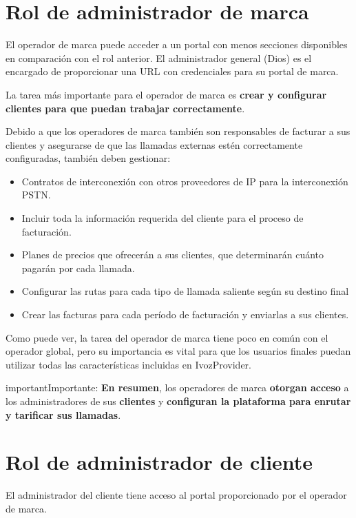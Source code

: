 \documentclass[letterpaper,10pt,spanish]{sphinxmanual}
\begin{document}
\section{Rol de administrador de marca}
\label{basic_concepts/operation_roles/index:brand-administrator-role}
El operador de marca puede acceder a un portal con menos secciones disponibles en comparación con el rol anterior. El administrador general (Dios) es el encargado de proporcionar una URL con credenciales para su portal de marca.

La tarea más importante para el operador de marca es \textbf{crear y configurar clientes para que puedan trabajar correctamente}.

Debido a que los operadores de marca también son responsables de facturar a sus clientes y asegurarse de que las llamadas externas estén correctamente configuradas, también deben gestionar:
\begin{itemize}
\item {} 
Contratos de interconexión con otros proveedores de IP para la interconexión PSTN.

\item {} 
Incluir toda la información requerida del cliente para el proceso de facturación.

\item {} 
Planes de precios que ofrecerán a sus clientes, que determinarán cuánto pagarán por cada llamada.

\item {} 
Configurar las rutas para cada tipo de llamada saliente según su destino final

\item {} 
Crear las facturas para cada período de facturación y enviarlas a sus clientes.

\end{itemize}

Como puede ver, la tarea del operador de marca tiene poco en común con el operador global, pero su importancia es vital para que los usuarios finales puedan utilizar todas las características incluidas en IvozProvider.
\label{basic_concepts/operation_roles/index:brand-responsibilities}
\begin{notice}{important}{Importante:}
\textbf{En resumen}, los operadores de marca \textbf{otorgan acceso} a los administradores de sus \textbf{clientes} y \textbf{configuran la plataforma para enrutar y tarificar sus llamadas}.
\end{notice}


\section{Rol de administrador de cliente}
\label{basic_concepts/operation_roles/index:client-administrator-role}
El administrador del cliente tiene acceso al portal proporcionado por el operador de marca.
\end{document}
